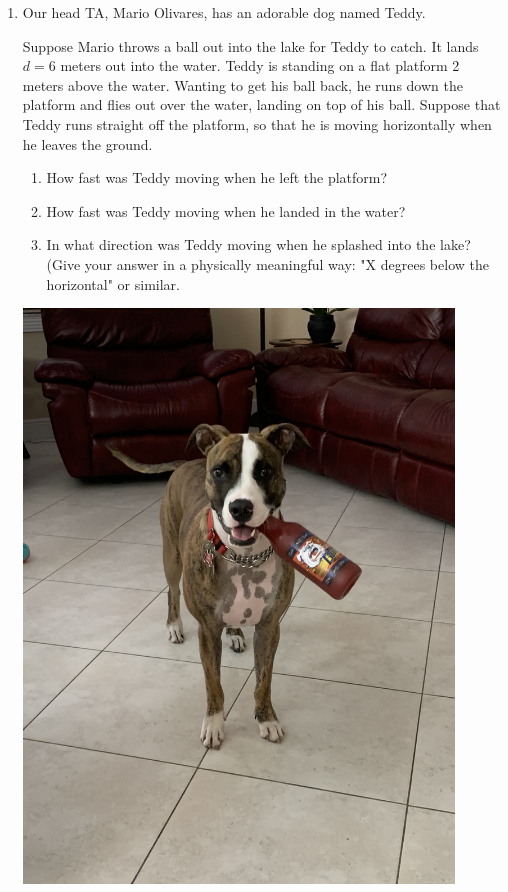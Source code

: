 \documentclass[12pt]{article}
\begin{document}
\begin{enumerate}
\item Our head TA, Mario Olivares, has an adorable dog named Teddy. 
\bigskip

	\begin{minipage}{0.5\textwidth}

	Suppose Mario throws a ball out into the lake for Teddy to catch. It lands $d=6$ meters out into the water. Teddy is standing on a flat platform 2 meters above the water. Wanting to get his ball back, he runs down the 
		platform and flies out over the water, landing on top of his ball. Suppose that Teddy runs straight off the platform, so that he is moving horizontally when he leaves the ground.

\begin{enumerate}
\item How fast was Teddy moving when he left the platform? 
\item How fast was Teddy moving when he landed in the water?
\item In what direction was Teddy moving when he splashed into the lake? (Give your answer in a physically meaningful way: "X degrees below the horizontal" or similar.
\end{enumerate}

	\end{minipage}
		\begin{minipage}{0.5\textwidth}
			\begin{center}
				\includegraphics[width=0.9\textwidth]{teddy.jpg}
			\end{center}
		\end{minipage}


\end{enumerate}
\end{document}
